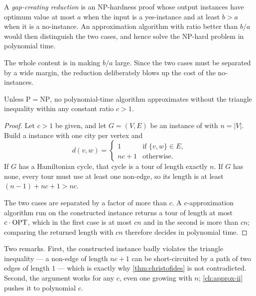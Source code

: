 \begin{definition}\label{def:gap-technique}
A \emph{gap-creating reduction} is an \textrm{NP}-hardness proof whose output
instances have optimum value at most $a$ when the input is a yes-instance and
at least $b > a$ when it is a no-instance. An approximation algorithm with
ratio better than $b/a$ would then distinguish the two cases, and hence solve
the \textrm{NP}-hard problem in polynomial time.
\end{definition}

The whole content is in making $b/a$ large. Since the two cases must be
separated by a wide margin, the reduction deliberately blows up the cost of the
no-instances.

\begin{theorem}\label{thm:tsp-no-approx}
Unless $\mathrm{P} = \mathrm{NP}$, no polynomial-time algorithm approximates
 without the triangle inequality within any constant ratio $c > 1$.
\end{theorem}

\begin{proof}
Let $c > 1$ be given, and let $G = (V,E)$ be an instance of
 with $n = |V|$. Build a  instance with one
city per vertex and
\[
  d(v,w) = \begin{cases}
    1 & \text{if } \{v,w\} \in E, \\
    nc + 1 & \text{otherwise.}
  \end{cases}
\]
If $G$ has a Hamiltonian cycle, that cycle is a tour of length exactly $n$. If
$G$ has none, every tour must use at least one non-edge, so its length is at
least $(n-1) + nc + 1 > nc$.

The two cases are separated by a factor of more than $c$. A $c$-approximation
algorithm run on the constructed instance returns a tour of length at most
$c \cdot \mathrm{OPT}$, which in the first case is at most $cn$ and in the second is
more than $cn$; comparing the returned length with $cn$ therefore decides
 in polynomial time.
\end{proof}

Two remarks. First, the constructed instance badly violates the triangle
inequality --- a non-edge of length $nc+1$ can be short-circuited by a path of
two edges of length $1$ --- which is exactly why \cref{thm:christofides} is not
contradicted. Second, the argument works for any $c$, even one growing with
$n$; \cref{ch:approx-ii} pushes it to polynomial $c$.

